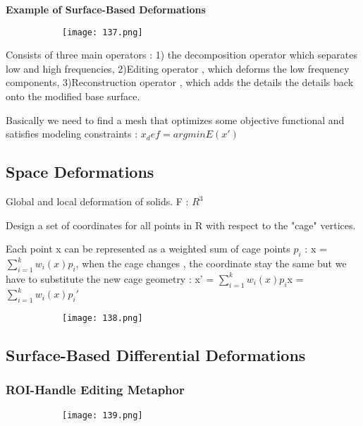 \documentclass{article}
\begin{document}
\textbf{Example of Surface-Based Deformations}


    \begin{figure}[ht!]
  \centering
  \begin{subfigure}[b]{0.4\linewidth}
    \texttt{[image: 137.png]}
  \end{subfigure}
\end{figure}

Consists of three main operators : 1) the decomposition operator which separates low and high frequencies, 2)Editing operator , which deforms the low frequency components, 3)Reconstruction operator , which adds the details the details back onto the modified base surface.

Basically we need to find a mesh that optimizes some objective functional and satisfies modeling constraints : $x_def = argmin E(x')$

\subsection{Space Deformations}

Global and local deformation of solids. F : $R^3$ 

Design a set of coordinates for all points in R with respect to the "cage" vertices.

Each point x can be represented as a weighted sum of cage points $p_i$ : x = $\sum_{i=1}^k w_i (x)p_i$, when the cage changes , the coordinate stay the same but we have to substitute the new cage geometry : x' = $\sum_{i=1}^k w_i (x)p_i$x = $\sum_{i=1}^k w_i (x)p_i'$


    \begin{figure}[ht!]
  \centering
  \begin{subfigure}[b]{0.3\linewidth}
    \texttt{[image: 138.png]}
  \end{subfigure}
\end{figure}

\subsection{Surface-Based Differential Deformations}

\subsubsection{ROI-Handle Editing Metaphor}

    \begin{figure}[ht!]
  \centering
  \begin{subfigure}[b]{0.5\linewidth}
    \texttt{[image: 139.png]}
  \end{subfigure}
\end{figure}
\end{document}
